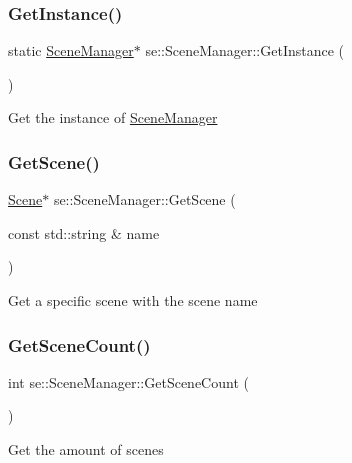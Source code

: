 \subsubsection{\texorpdfstring{Get\+Instance()}{GetInstance()}}
{\footnotesize\ttfamily static \mbox{\hyperlink{classse_1_1_scene_manager}{Scene\+Manager}}$\ast$ se\+::\+Scene\+Manager\+::\+Get\+Instance (\begin{DoxyParamCaption}{ }\end{DoxyParamCaption})\hspace{0.3cm}{\ttfamily [static]}}

Get the instance of \mbox{\hyperlink{classse_1_1_scene_manager}{Scene\+Manager}} \mbox{\label{classse_1_1_scene_manager_a07360d102e47455f497c844d7ad36ecb}} 
\subsubsection{\texorpdfstring{Get\+Scene()}{GetScene()}}
{\footnotesize\ttfamily \mbox{\hyperlink{classse_1_1_scene}{Scene}}$\ast$ se\+::\+Scene\+Manager\+::\+Get\+Scene (\begin{DoxyParamCaption}\item[{const std\+::string \&}]{name }\end{DoxyParamCaption})}

Get a specific scene with the scene name \mbox{\label{classse_1_1_scene_manager_aac6929d7dfd933c4d40fbf66b3740321}} 
\subsubsection{\texorpdfstring{Get\+Scene\+Count()}{GetSceneCount()}}
{\footnotesize\ttfamily int se\+::\+Scene\+Manager\+::\+Get\+Scene\+Count (\begin{DoxyParamCaption}{ }\end{DoxyParamCaption})}

Get the amount of scenes \mbox{\label{classse_1_1_scene_manager_a354707c12a744c1f86e9433b312f8203}} 
